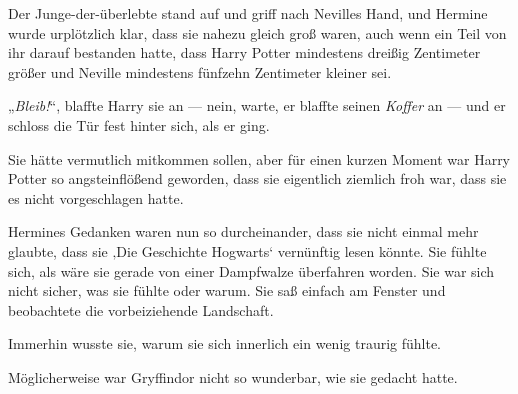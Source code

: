 Der Junge-der-überlebte stand auf und griff nach Nevilles Hand, und Hermine wurde urplötzlich klar, dass sie nahezu gleich groß waren, auch wenn ein Teil von ihr darauf bestanden hatte, dass Harry Potter mindestens dreißig Zentimeter größer und Neville mindestens fünfzehn Zentimeter kleiner sei.

„\emph{Bleib!}“, blaffte Harry sie an — nein, warte, er blaffte seinen \emph{Koffer} an — und er schloss die Tür fest hinter sich, als er ging.

Sie hätte vermutlich mitkommen sollen, aber für einen kurzen Moment war Harry Potter so angsteinflößend geworden, dass sie eigentlich ziemlich froh war, dass sie es nicht vorgeschlagen hatte.

Hermines Gedanken waren nun so durcheinander, dass sie nicht einmal mehr glaubte, dass sie ‚Die Geschichte Hogwarts‘ vernünftig lesen könnte. Sie fühlte sich, als wäre sie gerade von einer Dampfwalze überfahren worden. Sie war sich nicht sicher, was sie fühlte oder warum. Sie saß einfach am Fenster und beobachtete die vorbeiziehende Landschaft.

Immerhin wusste sie, warum sie sich innerlich ein wenig traurig fühlte.

Möglicherweise war Gryffindor nicht so wunderbar, wie sie gedacht hatte.

